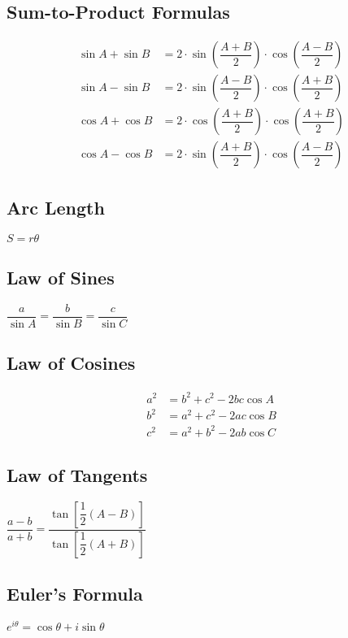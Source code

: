 \documentclass{article}
\begin{document}
	
	\subsection{Sum-to-Product Formulas}
	\begin{align*}
		\sin{A} + \sin{B} &= 2 \cdot \sin{\left( \dfrac{A + B}{2}  \right)} \cdot \cos{\left( \dfrac{A - B}{2}  \right)}\\
		\sin{A} - \sin{B} &= 2 \cdot \sin{\left( \dfrac{A - B}{2}  \right)} \cdot \cos{\left( \dfrac{A + B}{2}  \right)}\\
		\cos{A} + \cos{B} &= 2 \cdot \cos{\left( \dfrac{A + B}{2}  \right)} \cdot \cos{\left( \dfrac{A + B}{2}  \right)}\\
		\cos{A} - \cos{B} &= 2 \cdot \sin{\left( \dfrac{A + B}{2}  \right)} \cdot \cos{\left( \dfrac{A - B}{2}  \right)}
	\end{align*}
	
	
	\subsection{Arc Length}
	$S = r\theta$
	
	
	\subsection{Law of Sines}
	$\dfrac{a}{\sin{A}} = \dfrac{b}{\sin{B}} = \dfrac{c}{\sin{C}}$
	
	
	\subsection{Law of Cosines}
	\begin{align*}
		a^2 &= b^2 + c^2 - 2bc \cos{A} \\
		b^2 &= a^2 + c^2 - 2ac \cos{B} \\
		c^2 &= a^2 + b^2 - 2ab \cos{C}
	\end{align*}
	
	
	\subsection{Law of Tangents}
	$\dfrac{a - b}{a + b} = \dfrac{\tan{\left[ \dfrac{1}{2}(A - B)  \right]}}{\tan{\left[ \dfrac{1}{2}(A + B)  \right]}}$
	
	
	\subsection{Euler's Formula}
	$e^{i\theta} = \cos{\theta} + i\sin{\theta}$
	
\end{document}
